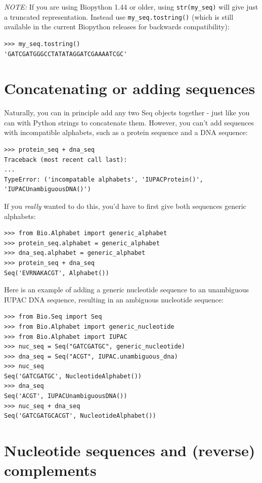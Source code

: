 \documentclass{report}
\begin{document}
\emph{NOTE:} If you are using Biopython 1.44 or older, using \verb|str(my_seq)|
will give just a truncated representation.  Instead use \verb|my_seq.tostring()|
(which is still available in the current Biopython releases for backwards compatibility):

\begin{verbatim}
>>> my_seq.tostring()
'GATCGATGGGCCTATATAGGATCGAAAATCGC'
\end{verbatim}

\section{Concatenating or adding sequences}

Naturally, you can in principle add any two Seq objects together - just like you can with Python strings to concatenate them.  However, you can't add sequences with incompatible alphabets, such as a protein sequence and a DNA sequence:

\begin{verbatim}
>>> protein_seq + dna_seq
Traceback (most recent call last):
...
TypeError: ('incompatable alphabets', 'IUPACProtein()', 'IUPACUnambiguousDNA()')
\end{verbatim}

If you \emph{really} wanted to do this, you'd have to first give both sequences generic alphabets:

\begin{verbatim}
>>> from Bio.Alphabet import generic_alphabet
>>> protein_seq.alphabet = generic_alphabet
>>> dna_seq.alphabet = generic_alphabet
>>> protein_seq + dna_seq
Seq('EVRNAKACGT', Alphabet())
\end{verbatim}

Here is an example of adding a generic nucleotide sequence to an unambiguous IUPAC DNA sequence, resulting in an ambiguous nucleotide sequence:

\begin{verbatim}
>>> from Bio.Seq import Seq
>>> from Bio.Alphabet import generic_nucleotide
>>> from Bio.Alphabet import IUPAC
>>> nuc_seq = Seq("GATCGATGC", generic_nucleotide)
>>> dna_seq = Seq("ACGT", IUPAC.unambiguous_dna)
>>> nuc_seq
Seq('GATCGATGC', NucleotideAlphabet())
>>> dna_seq
Seq('ACGT', IUPACUnambiguousDNA())
>>> nuc_seq + dna_seq
Seq('GATCGATGCACGT', NucleotideAlphabet())
\end{verbatim}

\section{Nucleotide sequences and (reverse) complements}
\label{sec:seq-reverse-complement}
\end{document}
